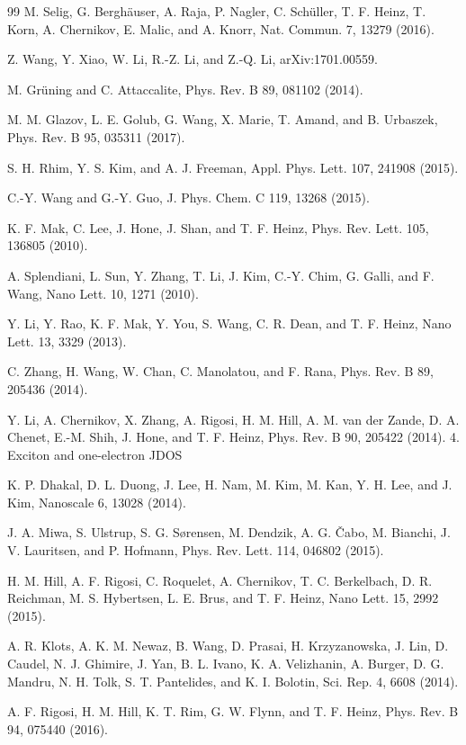 \documentclass[11pt,a4paper]{ctexart}
\begin{document}
\begin{thebibliography}{99}
 M. Selig, G. Berghäuser, A. Raja, P. Nagler, C. Schüller, T. F. Heinz, T. Korn, A. Chernikov, E. Malic, and A. Knorr, Nat. Commun. 7, 13279 (2016).

 Z. Wang, Y. Xiao, W. Li, R.-Z. Li, and Z.-Q. Li, arXiv:1701.00559.

 M. Grüning and C. Attaccalite, Phys. Rev. B 89, 081102 (2014).

 M. M. Glazov, L. E. Golub, G. Wang, X. Marie, T. Amand, and B. Urbaszek, Phys. Rev. B 95, 035311 (2017).

 S. H. Rhim, Y. S. Kim, and A. J. Freeman, Appl. Phys. Lett. 107, 241908 (2015).

 C.-Y. Wang and G.-Y. Guo, J. Phys. Chem. C 119, 13268 (2015).

 K. F. Mak, C. Lee, J. Hone, J. Shan, and T. F. Heinz, Phys. Rev. Lett. 105, 136805 (2010).

 A. Splendiani, L. Sun, Y. Zhang, T. Li, J. Kim, C.-Y. Chim, G. Galli, and F. Wang, Nano Lett. 10, 1271 (2010).

 Y. Li, Y. Rao, K. F. Mak, Y. You, S. Wang, C. R. Dean, and T. F. Heinz, Nano Lett. 13, 3329 (2013).

 C. Zhang, H. Wang, W. Chan, C. Manolatou, and F. Rana, Phys. Rev. B 89, 205436 (2014).

 Y. Li, A. Chernikov, X. Zhang, A. Rigosi, H. M. Hill, A. M. van der Zande, D. A. Chenet, E.-M. Shih, J. Hone, and T. F. Heinz, Phys. Rev. B 90, 205422 (2014). 4. Exciton and one-electron JDOS

 K. P. Dhakal, D. L. Duong, J. Lee, H. Nam, M. Kim, M. Kan, Y. H. Lee, and J. Kim, Nanoscale 6, 13028 (2014).

 J. A. Miwa, S. Ulstrup, S. G. Sørensen, M. Dendzik, A. G. Čabo, M. Bianchi, J. V. Lauritsen, and P. Hofmann, Phys. Rev. Lett. 114, 046802 (2015).

 H. M. Hill, A. F. Rigosi, C. Roquelet, A. Chernikov, T. C. Berkelbach, D. R. Reichman, M. S. Hybertsen, L. E. Brus, and T. F. Heinz, Nano Lett. 15, 2992 (2015).

 A. R. Klots, A. K. M. Newaz, B. Wang, D. Prasai, H. Krzyzanowska, J. Lin, D. Caudel, N. J. Ghimire, J. Yan, B. L. Ivano, K. A. Velizhanin, A. Burger, D. G. Mandru, N. H. Tolk, S. T. Pantelides, and K. I. Bolotin, Sci. Rep. 4, 6608 (2014).

 A. F. Rigosi, H. M. Hill, K. T. Rim, G. W. Flynn, and T. F. Heinz, Phys. Rev. B 94, 075440 (2016).


\end{thebibliography}
\end{document}
